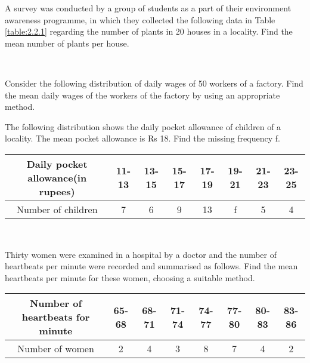 \item A survey was conducted by a group of students as a part of their environment awareness
programme, in which they collected the following data in Table \ref{table:2.2.1}
regarding the number of plants in
20 houses in a locality. Find the mean number of plants per house.
\begin{table}[!ht]
\centering
{}
\caption{}
\label{table:2.2.1}
\end{table}
\\
\solution

\item Consider the following distribution of daily wages of 50 workers of a factory.
Find the mean daily wages of the workers of the factory by using an appropriate method.
\item The following distribution shows the daily pocket allowance of children of a locality.
The mean pocket allowance is Rs 18. Find the missing frequency f.
\begin{tabular}{|c|c|c|c|c|c|c|c|}
\hline
Daily pocket allowance(in rupees) &11-13&13-15&15-17&17-19&19-21&21-23&23-25\\
\hline
Number of children&7&6&9&13&f&5&4\\
\hline
\end{tabular}\\
\item Thirty women were examined in a hospital by a doctor and the number of heartbeats per
minute were recorded and summarised as follows. Find the mean heartbeats per minute
for these women, choosing a suitable method.
\begin{tabular}{|c|c|c|c|c|c|c|c|}
\hline
Number of heartbeats for minute &65-68&68-71&71-74&74-77&77-80&80-83&83-86\\
\hline
Number of women&2&4&3&8&7&4&2\\
\hline
\end{tabular}\\
